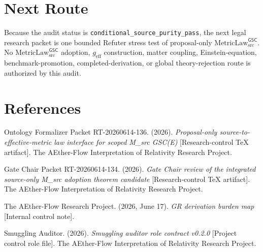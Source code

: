 \documentclass[11pt]{article}
\newcommand{\MetricLaw}{\mathrm{MetricLaw}_{\mathrm{src}}^{\mathsf{GSC}}}
\newcommand{\geff}{g_{\mathrm{eff}}}
\begin{document}
\section{Next Route}

Because the audit status is
\texttt{conditional\_source\_purity\_pass}, the next legal research packet is
one bounded Refuter stress test of proposal-only \(\MetricLaw\). No
\(\MetricLaw\) adoption, \(\geff\) construction, matter coupling,
Einstein-equation, benchmark-promotion, completed-derivation, or global
theory-rejection route is authorized by this audit.

\section*{References}

Ontology Formalizer Packet RT-20260614-136. (2026). \textit{Proposal-only
source-to-effective-metric law interface for scoped M\_src GSC(E)}
[Research-control TeX artifact]. The AEther-Flow Interpretation of Relativity
Research Project.

Gate Chair Packet RT-20260614-134. (2026). \textit{Gate Chair review of the
integrated source-only M\_src adoption theorem candidate} [Research-control
TeX artifact]. The AEther-Flow Interpretation of Relativity Research Project.

The AEther-Flow Research Project. (2026, June 17). \textit{GR derivation
burden map} [Internal control note].

Smuggling Auditor. (2026). \textit{Smuggling auditor role contract v0.2.0}
[Project control role file]. The AEther-Flow Interpretation of Relativity
Research Project.
\end{document}
